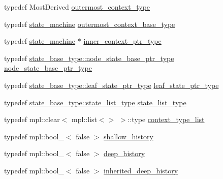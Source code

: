 \begin{DoxyCompactItemize}
\item 
typedef Most\+Derived \mbox{\hyperlink{classboost_1_1statechart_1_1state__machine_a3c047829e797a9501c7d69151d17e368}{outermost\+\_\+context\+\_\+type}}
\item 
typedef \mbox{\hyperlink{classboost_1_1statechart_1_1state__machine}{state\+\_\+machine}} \mbox{\hyperlink{classboost_1_1statechart_1_1state__machine_a05b007af532fafe2f186a18351beaa5e}{outermost\+\_\+context\+\_\+base\+\_\+type}}
\item 
typedef \mbox{\hyperlink{classboost_1_1statechart_1_1state__machine}{state\+\_\+machine}} $\ast$ \mbox{\hyperlink{classboost_1_1statechart_1_1state__machine_a9943ccf227161502104d8843521b6131}{inner\+\_\+context\+\_\+ptr\+\_\+type}}
\item 
typedef \mbox{\hyperlink{classboost_1_1statechart_1_1detail_1_1state__base_a8e3dd0f80bf95d7df21417a50f1dbaa1}{state\+\_\+base\+\_\+type\+::node\+\_\+state\+\_\+base\+\_\+ptr\+\_\+type}} \mbox{\hyperlink{classboost_1_1statechart_1_1state__machine_a5d90f1176309ec8307979aa79dd6f4a3}{node\+\_\+state\+\_\+base\+\_\+ptr\+\_\+type}}
\item 
typedef \mbox{\hyperlink{classboost_1_1statechart_1_1detail_1_1state__base_a80b7d62ba0bb8e4fbef3e2e76e2a6021}{state\+\_\+base\+\_\+type\+::leaf\+\_\+state\+\_\+ptr\+\_\+type}} \mbox{\hyperlink{classboost_1_1statechart_1_1state__machine_a70f60d22dbc67497b1388e72e2bf6824}{leaf\+\_\+state\+\_\+ptr\+\_\+type}}
\item 
typedef \mbox{\hyperlink{classboost_1_1statechart_1_1detail_1_1state__base_a30bb6c4893e4cd84e80133feb2cc8230}{state\+\_\+base\+\_\+type\+::state\+\_\+list\+\_\+type}} \mbox{\hyperlink{classboost_1_1statechart_1_1state__machine_afe501a67ddcd1da38728f6c672b57198}{state\+\_\+list\+\_\+type}}
\item 
typedef mpl\+::clear$<$ mpl\+::list$<$$>$ $>$\+::type \mbox{\hyperlink{classboost_1_1statechart_1_1state__machine_a40f2c6990aa142c91dd400bc677ccb15}{context\+\_\+type\+\_\+list}}
\item 
typedef mpl\+::bool\+\_\+$<$ false $>$ \mbox{\hyperlink{classboost_1_1statechart_1_1state__machine_a2e31e5e73f5e9e5f3714b04eb11cda08}{shallow\+\_\+history}}
\item 
typedef mpl\+::bool\+\_\+$<$ false $>$ \mbox{\hyperlink{classboost_1_1statechart_1_1state__machine_abd323e1963ca64cc774ed0ab2cff9dfd}{deep\+\_\+history}}
\item 
typedef mpl\+::bool\+\_\+$<$ false $>$ \mbox{\hyperlink{classboost_1_1statechart_1_1state__machine_a98a2ce0dcdc9f2abab9127ce3c1eea67}{inherited\+\_\+deep\+\_\+history}}
\end{DoxyCompactItemize}
